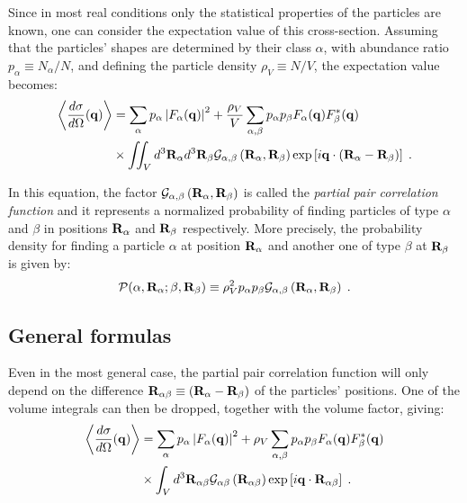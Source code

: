 Since in most real conditions only the statistical properties of the particles are known, one can consider the expectation value of this cross-section. Assuming that the particles' shapes are determined by their class $\alpha$, with abundance ratio $p_\alpha \equiv N_\alpha / N$, and defining the particle density $\rho_V \equiv N/V$, the expectation value becomes:
\begin{align*}
  \left\langle \frac{d\sigma}{d\Omega}(\mathbf{q}) \right\rangle  & = \sum_\alpha p_\alpha \left\lvert F_\alpha(\mathbf{q})\right\rvert ^2 + \frac{\rho_V}{V}\sum_{\alpha,\beta} p_\alpha p_\beta F_\alpha (\mathbf{q})F_\beta^*(\mathbf{q})  \\
  & \times \iint_V d^3\mathbf{R}_\alpha d^3\mathbf{R}_\beta \mathcal{G}_{\alpha ,\beta}\left( \mathbf{R}_{\alpha} , \mathbf{R}_{\beta} \right) \exp \left[ i\mathbf{q}\cdot (\mathbf{R}_\alpha - \mathbf{R}_\beta ) \right] \; .
\end{align*}

In this equation, the factor $\mathcal{G}_{\alpha ,\beta}\left( \mathbf{R}_{\alpha} , \mathbf{R}_{\beta} \right)$ is called the \emph{partial pair correlation function} and it represents a normalized probability of finding particles of type $\alpha$ and $\beta$ in positions $\mathbf{R}_\alpha$ and $\mathbf{R}_\beta$ respectively. More precisely, the probability density for finding a particle $\alpha$ at position $\mathbf{R}_\alpha$ and another one of type $\beta$ at $\mathbf{R}_\beta$ is given by:
\begin{equation*}
  \mathcal{P}(\alpha, \mathbf{R}_\alpha ; \beta , \mathbf{R}_\beta ) \equiv \rho_V^2 p_\alpha p_\beta \mathcal{G}_{\alpha ,\beta}\left( \mathbf{R}_{\alpha} , \mathbf{R}_{\beta} \right) \; .
\end{equation*}


\subsection{General formulas}

Even in the most general case, the partial pair correlation function will only depend on the difference $\mathbf{R}_{\alpha\beta}\equiv(\mathbf{R}_\alpha - \mathbf{R}_\beta )$ of the particles' positions. One of the volume integrals can then be dropped, together with the volume factor, giving:
\begin{align*}
  \left\langle \frac{d\sigma}{d\Omega}(\mathbf{q}) \right\rangle  & = \sum_\alpha p_\alpha \left\lvert F_\alpha(\mathbf{q})\right\rvert ^2 + \rho_V\sum_{\alpha,\beta} p_\alpha p_\beta F_\alpha (\mathbf{q})F_\beta^*(\mathbf{q}) \\
  & \times \int_V d^3\mathbf{R}_{\alpha\beta} \mathcal{G}_{\alpha \beta}\left( \mathbf{R}_{\alpha \beta} \right) \exp \left[ i\mathbf{q}\cdot \mathbf{R}_{\alpha\beta} \right] \; .
\end{align*}

